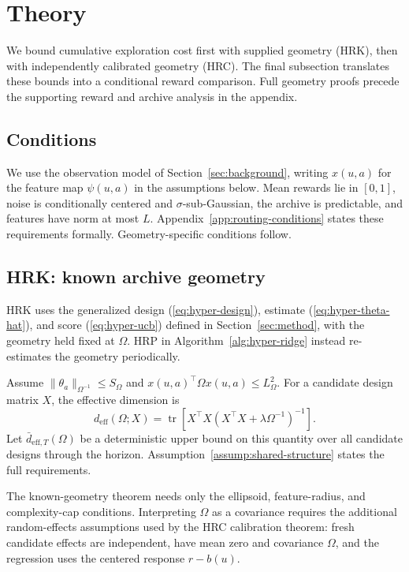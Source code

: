 \documentclass{article} %
\renewcommand{\eqref}[1]{\textup{(\ref{#1})}}
\begin{document}
\FloatBarrier
\section{Theory}
\label{sec:hyper-theory}
\label{sec:theory}

We bound cumulative exploration cost first with supplied geometry (HRK),
then with independently calibrated geometry (HRC). The final subsection
translates these bounds into a conditional reward comparison. Full geometry
proofs precede the supporting reward and archive analysis in the appendix.

\subsection{Conditions}
\label{sec:method-assump}

We use the observation model of Section~\ref{sec:background}, writing
$x(u,a)$ for the feature map $\psi(u,a)$ in the assumptions below.
Mean rewards lie in $[0,1]$, noise is conditionally centered and
$\sigma$-sub-Gaussian, the archive is predictable, and features have norm
at most $L$. Appendix~\ref{app:routing-conditions} states these requirements
formally. Geometry-specific conditions follow.

\subsection{HRK: known archive geometry}

HRK uses the generalized design
\eqref{eq:hyper-design}, estimate \eqref{eq:hyper-theta-hat}, and score
\eqref{eq:hyper-ucb} defined in Section~\ref{sec:method}, with the geometry
held fixed at \(\Omega\). HRP in Algorithm~\ref{alg:hyper-ridge}
instead re-estimates the geometry periodically.

Assume $\|\theta_a\|_{\Omega^{-1}}\le S_\Omega$ and
$x(u,a)^\top\Omega x(u,a)\le L_\Omega^2$.
For a candidate design matrix $X$, the effective dimension is
\begin{equation}
\label{eq:hyper-deff}
d_{\mathrm{eff}}(\Omega;X)
=
\operatorname{tr}
\!\left[
X^{\top}X
\left(
X^{\top}X+\lambda\Omega^{-1}
\right)^{-1}
\right].
\end{equation}
Let $\bar d_{\mathrm{eff},T}(\Omega)$ be a deterministic upper bound on this
quantity over all candidate designs through the horizon.
Assumption~\ref{assump:shared-structure} states the full requirements.

The known-geometry theorem needs only the ellipsoid, feature-radius, and
complexity-cap conditions. Interpreting $\Omega$ as a covariance requires the
additional random-effects assumptions used by the HRC calibration theorem:
fresh candidate effects are independent, have mean zero and covariance
$\Omega$, and the regression uses the centered response $r-b(u)$.
\end{document}
